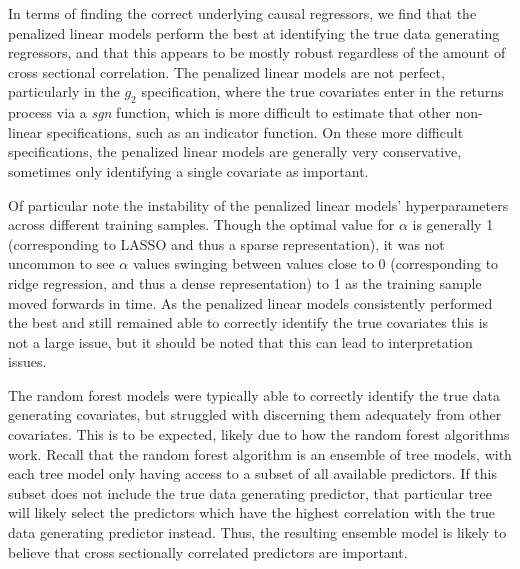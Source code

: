 \documentclass[a4paper, table]{article}
\begin{document}
In terms of finding the correct underlying causal regressors, we find that the penalized linear models perform the best at identifying the true data generating regressors, and that this appears to be mostly robust regardless of the amount of cross sectional correlation. The penalized linear models are not perfect, particularly in the $g_2$ specification, where the true covariates enter in the returns process via a \textit{sgn} function, which is more difficult to estimate that other non-linear specifications, such as an indicator function. On these more difficult specifications, the penalized linear models are generally very conservative, sometimes only identifying a single covariate as important. 

Of particular note the instability of the penalized linear models' hyperparameters across different training samples. Though the optimal value for $\alpha$ is generally 1 (corresponding to LASSO and thus a sparse representation), it was not uncommon to see $\alpha$ values swinging between values close to 0 (corresponding to ridge regression, and thus a dense representation) to 1 as the training sample moved forwards in time. As the penalized linear models consistently performed the best and still remained able to correctly identify the true covariates this is not a large issue, but it should be noted that this can lead to interpretation issues.

The random forest models were typically able to correctly identify the true data generating covariates, but struggled with discerning them adequately from other covariates. This is to be expected, likely due to how the random forest algorithms work. Recall that the random forest algorithm is an ensemble of tree models, with each tree model only having access to a subset of all available predictors. If this subset does not include the true data generating predictor, that particular tree will likely select the predictors which have the highest correlation with the true data generating predictor instead. Thus, the resulting ensemble model is likely to believe that cross sectionally correlated predictors are important.
\end{document}
